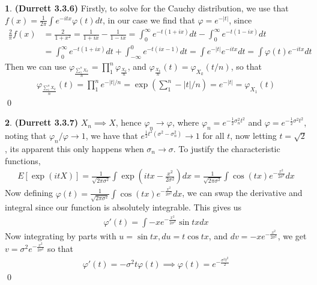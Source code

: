 \documentclass[10.5pt]{article}
\theoremstyle{definition}
\newtheorem{pb}{}
\newcommand{\abs}[1]{\lvert#1\rvert}
\begin{document}
    \begin{pb}\textbf{(Durrett 3.3.6)}
        Firstly, to solve for the Cauchy distribution, we use that \(f(x) = \frac{1}{2\pi}\int e^{-itx}\varphi(t)dt\), in our case we find that \(\varphi = e^{-\abs{t}}\), since
        \begin{align*}
            \frac{2}{\pi}f(x) &= \frac{2}{1+x^2} = \frac{1}{1+ix} - \frac{1}{1-ix} = \int_0^\infty e^{-t(1+ix)}dt - \int_0^\infty e^{-t(1-ix)}dt \\
            &= \int_0^\infty e^{-t(1+ix)}dt + \int_{-\infty}^0 e^{-t(ix - 1)}dt = \int e^{-\abs{t}}e^{-itx}dt = \int \varphi(t)e^{-itx}dt
        \end{align*}
        Then we can use \(\varphi_{\frac{\sum_1^n X_k}{n}} = \prod_1^n \varphi_{\frac{X_k}{n}}\), and \(\varphi_{\frac{X_k}{n}}(t) = \varphi_{X_k}(t/n)\), so that
        \begin{align*}
            \varphi_{\frac{\sum_1^n X_k}{n}}(t) = \prod_1^n e^{-\abs{t}/n} = \exp\left(\sum_1^n-\abs{t}/n \right)= e^{-\abs{t}} = \varphi_{X_1}(t)
        \end{align*} \qed
    \end{pb}
    \begin{pb}\textbf{(Durrett 3.3.7)}
        \(X_n \implies X\), hence \(\varphi_n \to \varphi\), where \(\varphi_n = e^{-\frac12 \sigma_n^2t^2}\) and \(\varphi = e^{-\frac12 \sigma^2t^2}\), noting that \(\varphi_n/\varphi \to 1\), we have that \(e^{\frac12 t^2 (\sigma^2 - \sigma_n^2)} \to 1\) for all \(t\), now letting \(t = \sqrt{2}\), its apparent this only happens when \(\sigma_n \to \sigma\). To justify the characteristic functions,
        \begin{align*}
            E[\exp(itX)] = \frac{1}{\sqrt{2\pi \sigma^2}}\int \exp(itx - \frac{x^2}{2\sigma^2})dx = \frac{1}{\sqrt{2\pi \sigma^2}}\int \cos(tx)e^{-\frac{x^2}{2 \sigma^2}}dx
        \end{align*}
        Now defining \(\varphi(t) = \frac{1}{\sqrt{2\pi \sigma^2}}\int \cos(tx)e^{-\frac{x^2}{2 \sigma^2}}dx\), we can swap the derivative and integral since our function is absolutely integrable. This gives us
        \begin{align*}
            \varphi'(t) = \int -xe^{-\frac{x^2}{2 \sigma^2}}\sin tx dx
        \end{align*}
        Now integrating by parts with \(u = \sin tx, du = t\cos tx\), and \(dv = -xe^{-\frac{x^2}{2 \sigma^2}}\), we get \(v = \sigma^2 e^{-\frac{x^2}{2 \sigma^2}}\) so that
        \begin{align*}
            \varphi'(t) = - \sigma^2t \varphi(t) \implies \varphi(t) = e^{- \frac{\sigma^2 t^2}{2}}
        \end{align*} \qed
    \end{pb}
\end{document}
